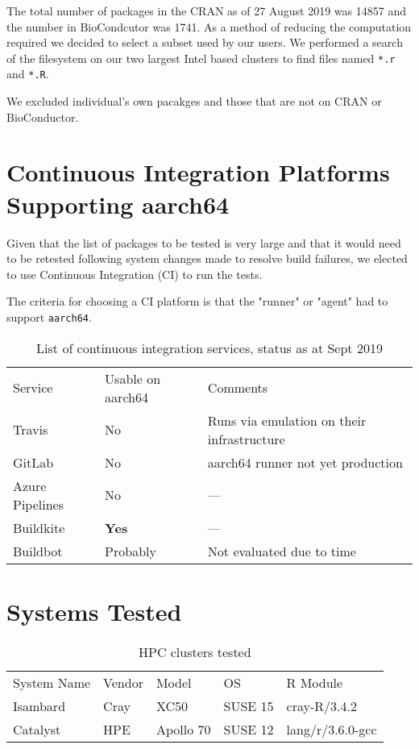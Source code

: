 \documentclass{article}
\begin{document}
The total number of packages in the \textsc{CRAN} as of 27 August 2019 was 14857 and the number in BioCondcutor was 1741. As a method of reducing the computation required we decided to select a subset used by our users. We performed a search of the filesystem on our two largest Intel based clusters to find files named \texttt{*.r} and \texttt{*.R}.

We excluded individual's own pacakges and those that are not on \textsc{CRAN} or BioConductor.

\section{Continuous Integration Platforms Supporting aarch64}

Given that the list of packages to be tested is very large and that it would need to be retested following system changes made to resolve build failures, we elected to use Continuous Integration (\textsc{CI}) to run the tests.

The criteria for choosing a \textsc{CI} platform is that the "runner" or "agent" had to support \texttt{aarch64}.

\begin{table}[h]
\begin{tabular}{lll}
\cline{1-3}
Service & Usable on aarch64 & Comments\\ \cline{1-3}
Travis & No & Runs via emulation on their infrastructure\\
GitLab & No & aarch64 runner not yet production\\
Azure Pipelines & No & ---\\
Buildkite & \textbf{Yes} & --- \\
Buildbot & Probably & Not evaluated due to time \\ \cline{1-3}
\end{tabular}
\caption{List of continuous integration services, status as at Sept 2019}
\label{tab:ci-services}
\end{table}

\section{Systems Tested}

\begin{table}[h]
\begin{tabular}{lllll}
\cline{1-5}
System Name & Vendor & Model & OS & R Module \\ \cline{1-5}
Isambard & Cray & XC50 & SUSE 15 & cray-R/3.4.2 \\
Catalyst & HPE & Apollo 70 & SUSE 12 & lang/r/3.6.0-gcc \\ \cline{1-5}
\end{tabular}
\caption{HPC clusters tested }
\label{tab:systems}
\end{table}
\end{document}
